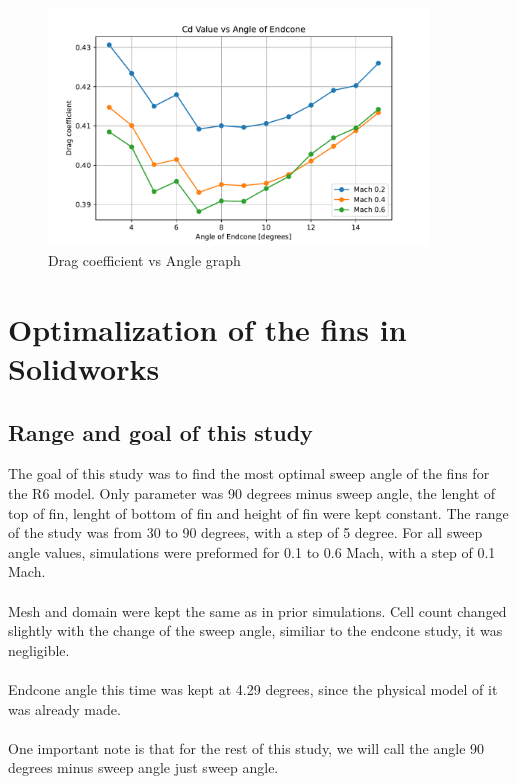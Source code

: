 \documentclass{article}
\begin{document}
\begin{figure}[H]
    \centering
    \includegraphics[width=0.9\textwidth]{../data/R6-Parametric-Endcone/CdVsAngle.pdf}
    \caption{Drag coefficient vs Angle graph}
    \label{fig:CdVsAngleEndcone}
\end{figure}



\section{Optimalization of the fins in Solidworks}
\subsection{Range and goal of this study}
The goal of this study was to find the most optimal sweep angle of the fins for the R6 model. 
Only parameter was 90 degrees minus sweep angle, the lenght of top of fin, lenght of bottom of fin and height of 
fin were kept constant. The range of the study was from 30 to 90 degrees, with a step of 5 degree. 
For all sweep angle values, simulations were preformed for 0.1 to 0.6 Mach, with a step of 0.1 Mach.\\\\
Mesh and domain were kept the same as in prior simulations. Cell count changed slightly with the 
change of the sweep angle, similiar to the endcone study, it was negligible.\\\\
Endcone angle this time was kept at 4.29 degrees, since the physical model of it was already made.\\\\
One important note is that for the rest of this study, we will call the angle 90 degrees minus sweep 
angle just sweep angle.\\\\
\end{document}
